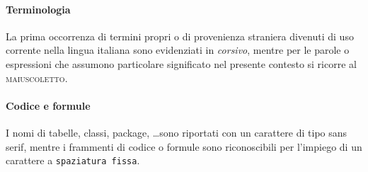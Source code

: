\paragraph{Terminologia} La prima occorrenza di termini propri o di provenienza straniera divenuti di uso corrente nella lingua italiana sono evidenziati in \textit{corsivo}, mentre per le parole o espressioni che assumono particolare significato nel presente contesto si ricorre al \textsc{maiuscoletto}.

\paragraph{Codice e formule} I nomi di tabelle, classi, package, \ldots sono riportati con un carattere di tipo \textsf{sans serif}, mentre i frammenti di codice o formule sono riconoscibili per l'impiego di un carattere a \texttt{spaziatura fissa}.
